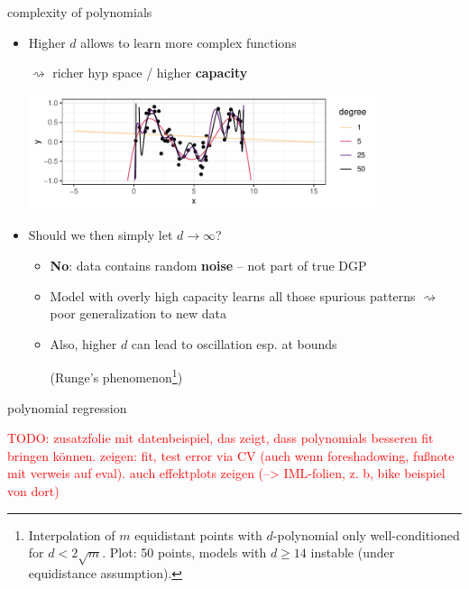 \documentclass[11pt,compress,t,notes=noshow, xcolor=table]{beamer}
\begin{document}
\begin{frame}{complexity of polynomials}

\begin{itemize}
  \item Higher $d$ allows to learn more complex functions 
  
  $\rightsquigarrow$ richer hyp space / higher \textbf{capacity}
  
  \vfill
  \includegraphics[width=0.8\textwidth]{figure/reg_poly_univ_4}
  \item Should we then simply let $d \rightarrow \infty$?
  \begin{itemize}
    \item \textbf{No}: data contains random \textbf{noise} -- not part of true
    DGP
    \item Model with overly high capacity learns all those spurious patterns
    $\rightsquigarrow$ poor generalization to new data
    \item Also, higher $d$ can lead to oscillation esp. at bounds 
    
    (Runge's phenomenon\footnote[frame]{\scriptsize
    Interpolation of $m$ equidistant points with $d$-polynomial only 
    well-conditioned for $d < 2 \sqrt{m}$. Plot: 50 points, models with $d \geq
    14$ instable (under equidistance assumption).
    })
    \vfill
  \end{itemize}
\end{itemize}

\end{frame}



\begin{frame}{polynomial regression}

\textcolor{red}{TODO: zusatzfolie mit datenbeispiel, das zeigt, dass polynomials 
besseren fit bringen können. zeigen: fit, test error via CV (auch wenn 
foreshadowing, fußnote mit verweis auf eval). auch effektplots zeigen 
(--> IML-folien, z. b, bike beispiel von dort)}

\end{frame}


\endlecture
\end{document}
